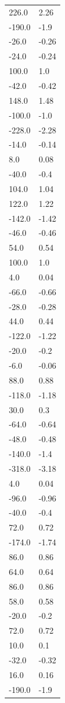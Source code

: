 \begin{longtable}{ll}
226.0 & 2.26 \\
-190.0 & -1.9 \\
-26.0 & -0.26 \\
-24.0 & -0.24 \\
100.0 & 1.0 \\
-42.0 & -0.42 \\
148.0 & 1.48 \\
-100.0 & -1.0 \\
-228.0 & -2.28 \\
-14.0 & -0.14 \\
8.0 & 0.08 \\
-40.0 & -0.4 \\
104.0 & 1.04 \\
122.0 & 1.22 \\
-142.0 & -1.42 \\
-46.0 & -0.46 \\
54.0 & 0.54 \\
100.0 & 1.0 \\
4.0 & 0.04 \\
-66.0 & -0.66 \\
-28.0 & -0.28 \\
44.0 & 0.44 \\
-122.0 & -1.22 \\
-20.0 & -0.2 \\
-6.0 & -0.06 \\
88.0 & 0.88 \\
-118.0 & -1.18 \\
30.0 & 0.3 \\
-64.0 & -0.64 \\
-48.0 & -0.48 \\
-140.0 & -1.4 \\
-318.0 & -3.18 \\
4.0 & 0.04 \\
-96.0 & -0.96 \\
-40.0 & -0.4 \\
72.0 & 0.72 \\
-174.0 & -1.74 \\
86.0 & 0.86 \\
64.0 & 0.64 \\
86.0 & 0.86 \\
58.0 & 0.58 \\
-20.0 & -0.2 \\
72.0 & 0.72 \\
10.0 & 0.1 \\
-32.0 & -0.32 \\
16.0 & 0.16 \\
-190.0 & -1.9 \\

\end{longtable}
